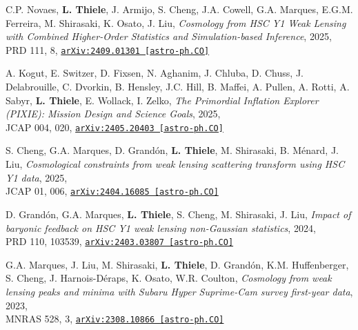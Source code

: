 \begin{minipage}{\textwidth}
C.P. Novaes, {\bf L. Thiele}, J. Armijo, S. Cheng, J.A. Cowell, G.A. Marques, E.G.M. Ferreira,
M. Shirasaki, K. Osato, J. Liu,
\emph{Cosmology from HSC Y1 Weak Lensing with Combined Higher-Order Statistics and
Simulation-based Inference}, 2025,\\
PRD 111, 8,
\href{https://arxiv.org/abs/2409.01301}{\mbox{\texttt{arXiv:2409.01301 [astro-ph.CO]}}}
\end{minipage}

\begin{minipage}{\textwidth}
A. Kogut, E. Switzer, D. Fixsen, N. Aghanim, J. Chluba, D. Chuss, J. Delabrouille,
C. Dvorkin, B. Hensley, J.C. Hill, B. Maffei, A. Pullen, A. Rotti, A. Sabyr,
{\bf L. Thiele}, E. Wollack, I. Zelko,
\emph{The Primordial Inflation Explorer (PIXIE): Mission Design and Science Goals}, 2025,\\
JCAP 004, 020,
\href{https://arxiv.org/abs/2405.20403}{\mbox{\texttt{arXiv:2405.20403 [astro-ph.CO]}}}
\end{minipage}

\begin{minipage}{\textwidth}
S. Cheng, G.A. Marques, D. Grand\'on, {\bf L. Thiele}, M. Shirasaki, B. M\'enard, J. Liu,
\emph{Cosmological constraints from weak lensing scattering transform using HSC Y1 data}, 2025,\\
JCAP 01, 006,
\href{https://arxiv.org/abs/2404.16085}{\mbox{\texttt{arXiv:2404.16085 [astro-ph.CO]}}}
\end{minipage}

\begin{minipage}{\textwidth}
D. Grand\'on, G.A. Marques, {\bf L. Thiele}, S. Cheng, M. Shirasaki, J. Liu,
\emph{Impact of baryonic feedback on HSC Y1 weak lensing non-Gaussian statistics}, 2024,\\
PRD 110, 103539,
\href{https://arxiv.org/abs/2403.03807}{\mbox{\texttt{arXiv:2403.03807 [astro-ph.CO]}}}
\end{minipage}

\begin{minipage}{\textwidth}
G.A. Marques, J. Liu, M. Shirasaki, {\bf L. Thiele}, D. Grand\'on, K.M. Huffenberger,
S. Cheng, J. Harnois-D\'eraps, K. Osato, W.R. Coulton,
\emph{Cosmology from weak lensing peaks and minima
      with Subaru Hyper Suprime-Cam survey first-year data}, 2023,\\
MNRAS 528, 3,
\href{https://arxiv.org/abs/2308.10866}{\mbox{\texttt{arXiv:2308.10866 [astro-ph.CO]}}}
\end{minipage}

